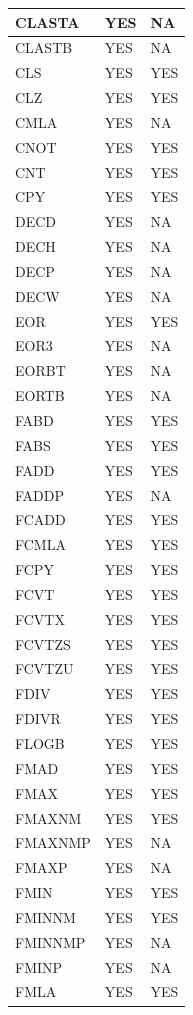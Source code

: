 \begin{longtable}{|l|l|l|}
\hline
CLASTA & YES & NA\\
\hline
CLASTB & YES & NA\\
\hline
CLS & YES & YES\\
\hline
CLZ & YES & YES\\
\hline
CMLA & YES & NA\\
\hline
CNOT & YES & YES\\
\hline
CNT & YES & YES\\
\hline
CPY & YES & YES\\
\hline
DECD & YES & NA\\
\hline
DECH & YES & NA\\
\hline
DECP & YES & NA\\
\hline
DECW & YES & NA\\
\hline
EOR & YES & YES\\
\hline
EOR3 & YES & NA\\
\hline
EORBT & YES & NA\\
\hline
EORTB & YES & NA\\
\hline
FABD & YES & YES\\
\hline
FABS & YES & YES\\
\hline
FADD & YES & YES\\
\hline
FADDP & YES & NA\\
\hline
FCADD & YES & YES\\
\hline
FCMLA & YES & YES\\
\hline
FCPY & YES & YES\\
\hline
FCVT & YES & YES\\
\hline
FCVTX & YES & YES\\
\hline
FCVTZS & YES & YES\\
\hline
FCVTZU & YES & YES\\
\hline
FDIV & YES & YES\\
\hline
FDIVR & YES & YES\\
\hline
FLOGB & YES & YES\\
\hline
FMAD & YES & YES\\
\hline
FMAX & YES & YES\\
\hline
FMAXNM & YES & YES\\
\hline
FMAXNMP & YES & NA\\
\hline
FMAXP & YES & NA\\
\hline
FMIN & YES & YES\\
\hline
FMINNM & YES & YES\\
\hline
FMINNMP & YES & NA\\
\hline
FMINP & YES & NA\\
\hline
FMLA & YES & YES\\

\end{longtable}
